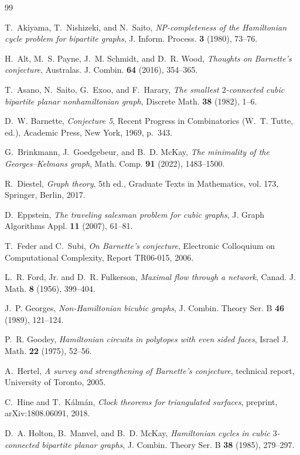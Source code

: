 \documentclass[a4paper]{amsart}
\numberwithin{equation}{section}
\theoremstyle{definition}
\begin{document}
\begin{thebibliography}{99}

T.~Akiyama, T.~Nishizeki, and N.~Saito, \emph{NP-completeness of the Hamiltonian cycle problem for bipartite graphs}, J. Inform. Process. \textbf{3} (1980), 73--76.

H.~Alt, M.~S. Payne, J.~M. Schmidt, and D.~R. Wood, \emph{Thoughts on Barnette's conjecture}, Australas. J. Combin. \textbf{64} (2016), 354--365.

T.~Asano, N.~Saito, G.~Exoo, and F.~Harary, \emph{The smallest $2$-connected cubic bipartite planar nonhamiltonian graph}, Discrete Math. \textbf{38} (1982), 1--6.

D.~W. Barnette, \emph{Conjecture 5}, Recent Progress in Combinatorics (W.~T. Tutte, ed.), Academic Press, New York, 1969, p.~343.

G.~Brinkmann, J.~Goedgebeur, and B.~D. McKay, \emph{The minimality of the Georges--Kelmans graph}, Math. Comp. \textbf{91} (2022), 1483--1500.

R.~Diestel, \emph{Graph theory}, 5th ed., Graduate Texts in Mathematics, vol. 173, Springer, Berlin, 2017.

D.~Eppstein, \emph{The traveling salesman problem for cubic graphs}, J. Graph Algorithms Appl. \textbf{11} (2007), 61--81.

T.~Feder and C.~Subi, \emph{On Barnette's conjecture}, Electronic Colloquium on Computational Complexity, Report TR06-015, 2006.

L.~R. Ford, Jr. and D.~R. Fulkerson, \emph{Maximal flow through a network}, Canad. J. Math. \textbf{8} (1956), 399--404.

J.~P. Georges, \emph{Non-Hamiltonian bicubic graphs}, J. Combin. Theory Ser. B \textbf{46} (1989), 121--124.

P.~R. Goodey, \emph{Hamiltonian circuits in polytopes with even sided faces}, Israel J. Math. \textbf{22} (1975), 52--56.

A.~Hertel, \emph{A survey and strengthening of Barnette's conjecture}, technical report, University of Toronto, 2005.

C.~Hine and T.~K\'alm\'an, \emph{Clock theorems for triangulated surfaces}, preprint, arXiv:1808.06091, 2018.

D.~A. Holton, B.~Manvel, and B.~D. McKay, \emph{Hamiltonian cycles in cubic $3$-connected bipartite planar graphs}, J. Combin. Theory Ser. B \textbf{38} (1985), 279--297.


\end{thebibliography}
\end{document}

